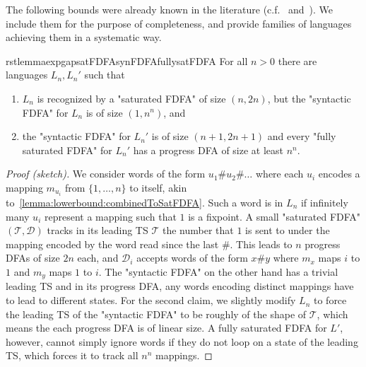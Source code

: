 \documentclass[a4paper,USenglish,cleveref,autoref,thm-restate]{lipics-v2021}
\newcommand{\mc}[1]{\ensuremath{\mathcal{#1}}}
\newcommand{\T}{\mc{T}}
\newcommand{\D}{\mc{D}}
\begin{document}
The following bounds were already known in the literature (c.f.~\cite[Section~5]{Klarlund94} and~\cite[Theorem~2]{AngluinF16}).
We include them for the purpose of completeness, and provide families of languages achieving them in a systematic way.

\begin{restatable}{rstlemma}{expgapsatFDFAsynFDFAfullysatFDFA}
    \label{lemma:expgapsatFDFAsynFDFAfullysatFDFA}
    For all $n > 0$ there are languages $L_n, L_n'$ such that
    \begin{enumerate}
        \item $L_n$ is recognized by a "saturated FDFA" of size $(n, 2n)$, but the "syntactic FDFA" for $L_n$ is of size $(1, n^n)$, and
        \item the "syntactic FDFA" for $L_n'$ is of size $(n+1, 2n + 1)$ and every "fully saturated FDFA" for $L_n'$ has a progress DFA of size at least $n^n$.
    \end{enumerate}
\end{restatable}
\begin{proof}[Proof (sketch)]
We consider words of the form $u_1\#u_2\#\dots$ where each $u_i$ encodes a mapping $m_{u_i}$ from $\{1,\dots,n\}$ to itself, akin to~\cref{lemma:lowerbound:combinedToSatFDFA}.
Such a word is in $L_n$ if infinitely many $u_i$ represent a mapping such that $1$ is a fixpoint.
A small "saturated FDFA" $(\T, \D)$ tracks in its leading TS $\T$ the number that $1$ is sent to under the mapping encoded by the word read since the last $\#$.
This leads to $n$ progress DFAs of size $2n$ each, and $\D_i$ accepts words of the form $x\#y$ where $m_x$ maps $i$ to $1$ and $m_y$ maps $1$ to $i$.
The "syntactic FDFA" on the other hand has a trivial leading TS and in its progress DFA, any words encoding distinct mappings have to lead to different states.
For the second claim, we slightly modify $L_n$ to force the leading TS of the "syntactic FDFA" to be roughly of the shape of $\T$, which means the each progress DFA is of linear size.
A fully saturated FDFA for $L'$, however, cannot simply ignore words if they do not loop on a state of the leading TS, which forces it to track all $n^n$ mappings.
\end{proof}
\end{document}

